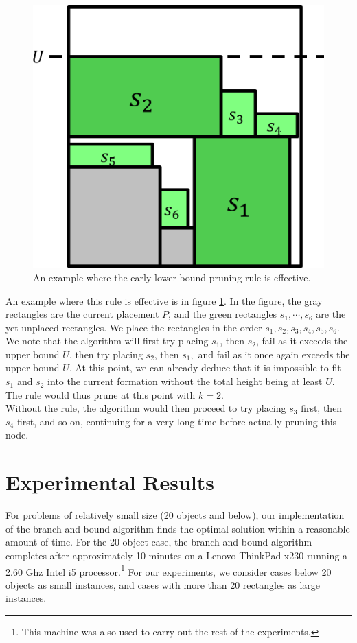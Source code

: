 \documentclass{article}
\begin{document}
\begin{figure}[!h]
  \centering
  \includegraphics[width=.4\linewidth]{diagrams/earlylowerbounds.png}
  \caption{An example where the early lower-bound pruning rule is effective.}
  \label{fig:earlylowerbounds}
\end{figure}

An example where this rule is effective is in figure \ref{fig:earlylowerbounds}. In the figure, the gray rectangles are the current placement $P$, and the green rectangles $s_1,\cdots,s_6$ are the yet unplaced rectangles. We place the rectangles in the order $s_1,s_2,s_3,s_4,s_5,s_6$. We note that the algorithm will first try placing $s_1$, then $s_2$, fail as it exceeds the upper bound $U$, then try placing $s_2$, then $s_1,$ and fail as it once again exceeds the upper bound $U$. At this point, we can already deduce that it is impossible to fit $s_1$ and $s_2$ into the current formation without the total height being at least $U$. The rule would thus prune at this point with $k = 2$.\\

Without the rule, the algorithm would then proceed to try placing $s_3$ first, then $s_4$ first, and so on, continuing for a very long time before actually pruning this node.

\section{Experimental Results}
For problems of relatively small size (20 objects and below), our implementation of the branch-and-bound algorithm finds the optimal solution within a reasonable amount of time. For the 20-object case, the branch-and-bound algorithm completes after approximately 10 minutes on a Lenovo ThinkPad x230 running a 2.60 Ghz Intel i5 processor.\footnote{This machine was also used to carry out the rest of the experiments.} For our experiments, we consider cases below 20 objects as small instances, and cases with more than 20 rectangles as large instances.
\end{document}

